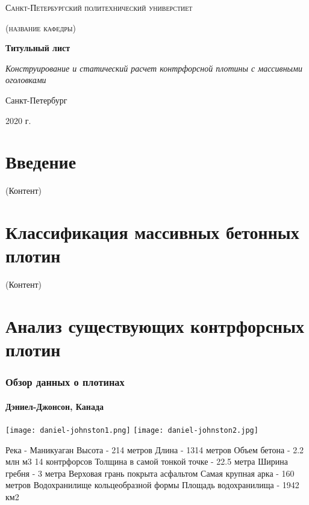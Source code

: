 \documentclass[12pt,a4paper,oneside,draft,titlepage]{article}
\begin{document}
\begin{titlepage}
	\centering
	{\scshape\LARGE Санкт-Петербургский политехнический универстиет \par}
	\vspace{1cm}
	{\scshape\Large (название кафедры)\par}
	\vspace{1.5cm}
	{\huge\bfseries Титульный лист\par}
	\vspace{2cm}
	{\Large\itshape Конструирование и статический расчет контрфорсной плотины с массивными оголовками\par}
	\vfill
	

	\vfill

	{\large Санкт-Петербург \par}
	{\large 2020 г. \par}
\end{titlepage}

\tableofcontents

\part{Введение}

(Контент)

\part{Классификация массивных бетонных плотин}

(Контент)

\part{Анализ существующих контрфорсных плотин}

\section{Обзор данных о плотинах}

\subsection{Дэниел-Джонсон, Канада}

\texttt{[image: daniel-johnston1.png]}
\texttt{[image: daniel-johnston2.jpg]}

Река - Маникуаган
Высота - 214 метров
Длина - 1314 метров
Объем бетона - 2.2 млн м3
14 контрфорсов
Толщина в самой тонкой точке - 22.5 метра
Ширина гребня - 3 метра
Верховая грань покрыта асфальтом
Самая крупная арка - 160 метров
Водохранилище кольцеобразной формы
Площадь водохранилища - 1942 км2
\end{document}
